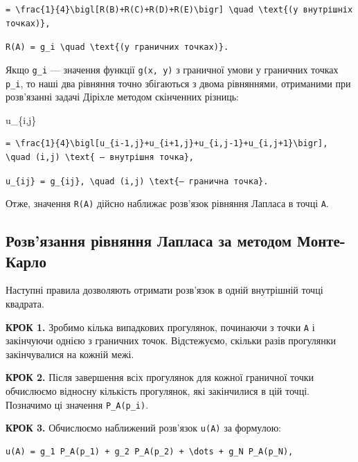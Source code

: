\documentclass[
  ukrainian,
]{article}
\begin{document}
\begin{verbatim}
= \frac{1}{4}\bigl[R(B)+R(C)+R(D)+R(E)\bigr] \quad \text{(у внутрішніх точках)},
\end{verbatim}

\texttt{\textquotesingle{}R(A)\textquotesingle{}\ =\ \textquotesingle{}g\_i\textquotesingle{}\ \textbackslash{}quad\ \textbackslash{}text\{(у\ граничних\ точках)\}.}

Якщо \texttt{g\_i} --- значення функції \texttt{g(x,\ y)} з граничної
умови у граничних точках \texttt{p\_i}, то наші два рівняння точно
збігаються з двома рівняннями, отриманими при розв'язанні задачі Діріхле
методом скінченних різниць:

u\_\{i,j\}

\begin{verbatim}
= \frac{1}{4}\bigl[u_{i-1,j}+u_{i+1,j}+u_{i,j-1}+u_{i,j+1}\bigr], \quad (i,j) \text{ — внутрішня точка},
\end{verbatim}

\texttt{\textquotesingle{}u\_\{ij\}\ =\ g\_\{ij\},\ \textbackslash{}quad\ (i,j)\ \textbackslash{}text\{\textquotesingle{}—\ гранична\ точка\}.}

Отже, значення \texttt{R(A)} дійсно наближає розв'язок рівняння Лапласа
в точці \texttt{A}.

\subsection{Розв'язання рівняння Лапласа за методом
Монте-Карло}\label{ux440ux43eux437ux432ux44fux437ux430ux43dux43dux44f-ux440ux456ux432ux43dux44fux43dux43dux44f-ux43bux430ux43fux43bux430ux441ux430-ux437ux430-ux43cux435ux442ux43eux434ux43eux43c-ux43cux43eux43dux442ux435-ux43aux430ux440ux43bux43e}

Наступні правила дозволяють отримати розв'язок в одній внутрішній точці
квадрата.

\textbf{КРОК 1.} Зробимо кілька випадкових прогулянок, починаючи з точки
\texttt{A} і закінчуючи однією з граничних точок. Відстежуємо, скільки
разів прогулянки закінчувалися на кожній межі.

\textbf{КРОК 2.} Після завершення всіх прогулянок для кожної граничної
точки обчислюємо відносну кількість прогулянок, які закінчилися в цій
точці. Позначимо ці значення \texttt{P\_A(p\_i)}.

\textbf{КРОК 3.} Обчислюємо наближений розв'язок \texttt{u(A)} за
формулою:

\begin{verbatim}
u(A) = g_1 P_A(p_1) + g_2 P_A(p_2) + \dots + g_N P_A(p_N),
\end{verbatim}
\end{document}
